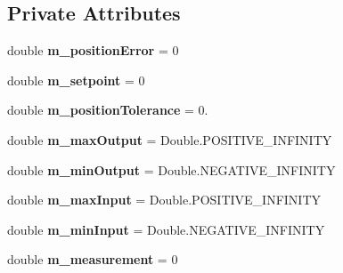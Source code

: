 \subsection*{Private Attributes}
\begin{DoxyCompactItemize}
\item 
\mbox{\label{classfrc_1_1robot_1_1controller_1_1_bang_bang_ae7135492ae168f875585fc6e5a87e6ba}} 
double {\bfseries m\+\_\+position\+Error} = 0
\item 
\mbox{\label{classfrc_1_1robot_1_1controller_1_1_bang_bang_a55f320805cf0761158e0e8b36ce9c5fe}} 
double {\bfseries m\+\_\+setpoint} = 0
\item 
\mbox{\label{classfrc_1_1robot_1_1controller_1_1_bang_bang_affc0c07a42ea05147b9bdcfcd136dc3a}} 
double {\bfseries m\+\_\+position\+Tolerance} = 0.
\item 
\mbox{\label{classfrc_1_1robot_1_1controller_1_1_bang_bang_a291486040626ecdb2063cc7f84e941f3}} 
double {\bfseries m\+\_\+max\+Output} = Double.\+P\+O\+S\+I\+T\+I\+V\+E\+\_\+\+I\+N\+F\+I\+N\+I\+TY
\item 
\mbox{\label{classfrc_1_1robot_1_1controller_1_1_bang_bang_aa24c877e404548cda808ae73d555ea6c}} 
double {\bfseries m\+\_\+min\+Output} = Double.\+N\+E\+G\+A\+T\+I\+V\+E\+\_\+\+I\+N\+F\+I\+N\+I\+TY
\item 
\mbox{\label{classfrc_1_1robot_1_1controller_1_1_bang_bang_a854ec7dfc4e827bfc475a6d75ae6b262}} 
double {\bfseries m\+\_\+max\+Input} = Double.\+P\+O\+S\+I\+T\+I\+V\+E\+\_\+\+I\+N\+F\+I\+N\+I\+TY
\item 
\mbox{\label{classfrc_1_1robot_1_1controller_1_1_bang_bang_aa057c05c7b5271d530c8efa95cc887d4}} 
double {\bfseries m\+\_\+min\+Input} = Double.\+N\+E\+G\+A\+T\+I\+V\+E\+\_\+\+I\+N\+F\+I\+N\+I\+TY
\item 
\mbox{\label{classfrc_1_1robot_1_1controller_1_1_bang_bang_ad47917a60436cba5fc91fb508488790f}} 
double {\bfseries m\+\_\+measurement} = 0
\end{DoxyCompactItemize}


